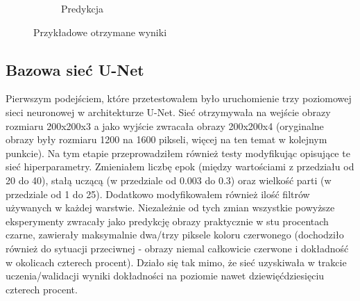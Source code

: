 \documentclass{article}
\begin{document}
\begin{figure}[H]
\begin{subfigure}{0.4\linewidth}
        \caption{Predykcja}
    \end{subfigure}
    \caption{Przykładowe otrzymane wyniki}
    \label{fig:input_and_output}
\end{figure}
\subsection{Bazowa sieć U-Net}
Pierwszym podejściem, które przetestowałem było uruchomienie trzy poziomowej sieci neuronowej w architekturze U-Net.
Sieć otrzymywała na wejście obrazy rozmiaru 200x200x3 a jako wyjście zwracała obrazy 200x200x4 (oryginalne obrazy były rozmiaru 1200 na 1600 pikseli, więcej na ten temat w kolejnym punkcie).
Na tym etapie przeprowadziłem również testy modyfikując opisujące te sieć hiperparametry.
Zmieniałem liczbę epok (między wartościami z przedziału od 20 do 40), stałą uczącą (w przedziale od 0.003 do 0.3) oraz wielkość parti (w przedziale od 1 do 25).
Dodatkowo modyfikowałem również ilość filtrów używanych w każdej warstwie.
Niezależnie od tych zmian wszystkie powyższe eksperymenty zwracały jako predykcję obrazy praktycznie w stu procentach czarne, zawierały maksymalnie dwa/trzy piksele koloru czerwonego (dochodziło również do sytuacji przeciwnej - obrazy niemal całkowicie czerwone i dokładność w okolicach czterech procent).
Działo się tak mimo, że sieć uzyskiwała w trakcie uczenia/walidacji wyniki dokładności na poziomie nawet dziewięćdziesięciu czterech procent.
\end{document}
